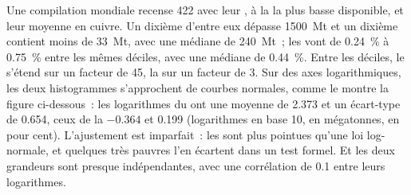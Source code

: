 Une compilation mondiale recense 422  avec leur , à la 
la plus basse disponible, et leur  moyenne en cuivre. Un dixième d'entre eux dépasse \qty{1500}{Mt} et
un dixième contient moins de \qty{33}{Mt}, avec une médiane de \qty{240}{Mt}~; les  vont de \qty{0.24}{\percent}
à \qty{0.75}{\percent} entre les mêmes déciles, avec une médiane de \qty{0.44}{\percent}. Entre
les déciles, le  s'étend sur un facteur de 45, la  sur un facteur de 3. Sur des axes logarithmiques,
les deux histogrammes s'approchent de courbes normales, comme le montre la figure ci-dessous~: les logarithmes
du  ont une moyenne de 2.373 et un écart-type de 0.654, ceux de la  $-0.364$ et 0.199 (logarithmes
en base 10,  en mégatonnes,  en pour cent). L'ajustement est imparfait~: les 
sont plus pointues qu'une loi log-normale, et quelques  très pauvres l'en écartent dans un test formel.
Et les deux grandeurs sont presque indépendantes, avec une corrélation de 0.1 entre leurs logarithmes.

